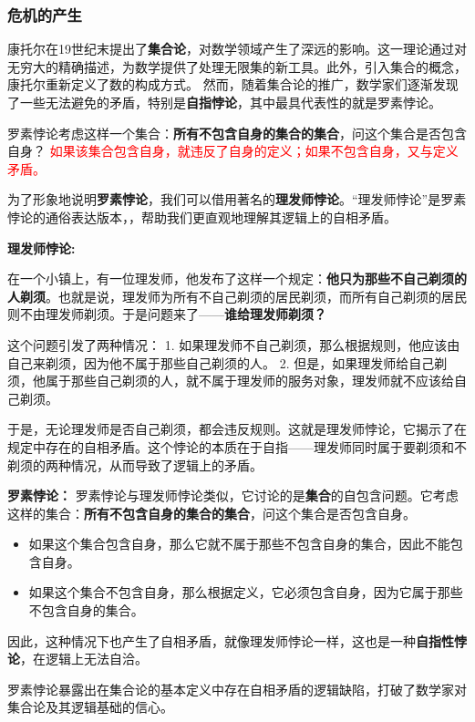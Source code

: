 \subsubsection{危机的产生}

康托尔在19世纪末提出了{\bf 集合论}，对数学领域产生了深远的影响。这一理论通过对无穷大的精确描述，为数学提供了处理无限集的新工具。此外，引入集合的概念，康托尔重新定义了数的构成方式。
然而，随着集合论的推广，数学家们逐渐发现了一些无法避免的矛盾，特别是{\bf 自指悖论}，其中最具代表性的就是罗素悖论。

罗素悖论考虑这样一个集合：{\bf 所有不包含自身的集合的集合}，问这个集合是否包含自身？
\textcolor{red}{如果该集合包含自身，就违反了自身的定义；如果不包含自身，又与定义矛盾。}

为了形象地说明{\bf 罗素悖论}，我们可以借用著名的{\bf 理发师悖论}。“理发师悖论”是罗素悖论的通俗表达版本，，帮助我们更直观地理解其逻辑上的自相矛盾。

{\bf 理发师悖论:}

在一个小镇上，有一位理发师，他发布了这样一个规定：{\bf 他只为那些不自己剃须的人剃须}。也就是说，理发师为所有不自己剃须的居民剃须，而所有自己剃须的居民则不由理发师剃须。于是问题来了——{\bf 谁给理发师剃须？}

这个问题引发了两种情况：
1. 如果理发师不自己剃须，那么根据规则，他应该由自己来剃须，因为他不属于那些自己剃须的人。
2. 但是，如果理发师给自己剃须，他属于那些自己剃须的人，就不属于理发师的服务对象，理发师就不应该给自己剃须。

于是，无论理发师是否自己剃须，都会违反规则。这就是理发师悖论，它揭示了在规定中存在的自相矛盾。这个悖论的本质在于自指——理发师同时属于要剃须和不剃须的两种情况，从而导致了逻辑上的矛盾。

{\bf 罗素悖论：}
罗素悖论与理发师悖论类似，它讨论的是{\bf 集合}的自包含问题。它考虑这样的集合：{\bf 所有不包含自身的集合的集合}，问这个集合是否包含自身。
\begin{itemize}
\item  如果这个集合包含自身，那么它就不属于那些不包含自身的集合，因此不能包含自身。
\item 如果这个集合不包含自身，那么根据定义，它必须包含自身，因为它属于那些不包含自身的集合。
\end{itemize}

因此，这种情况下也产生了自相矛盾，就像理发师悖论一样，这也是一种{\bf 自指性悖论}，在逻辑上无法自洽。

罗素悖论暴露出在集合论的基本定义中存在自相矛盾的逻辑缺陷，打破了数学家对集合论及其逻辑基础的信心。

